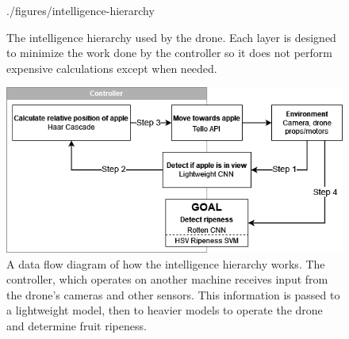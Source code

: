 \begin{figure}[htbp]
    {./figures/intelligence-hierarchy}
    \caption{
        The intelligence hierarchy used by the drone.
        Each layer is designed to minimize the work done by the controller so it does not perform expensive calculations except when needed.
    }
    \label{fig:intelligence-hierarchy}
\end{figure}

\begin{figure}[htbp]
    \fontsize{7}{5}\selectfont
    \centering
    \includegraphics[width=\columnwidth,keepaspectratio]
    {./figures/fruit-fly-model-diagram}
    \caption{
        A data flow diagram of how the intelligence hierarchy works.
        The controller, which operates on another machine receives input from the drone's cameras and other sensors.
        This information is passed to a lightweight model, then to heavier models to operate the drone and determine fruit ripeness.
    }
    \label{fig:fruit-fly-model-diagram}
\end{figure}
